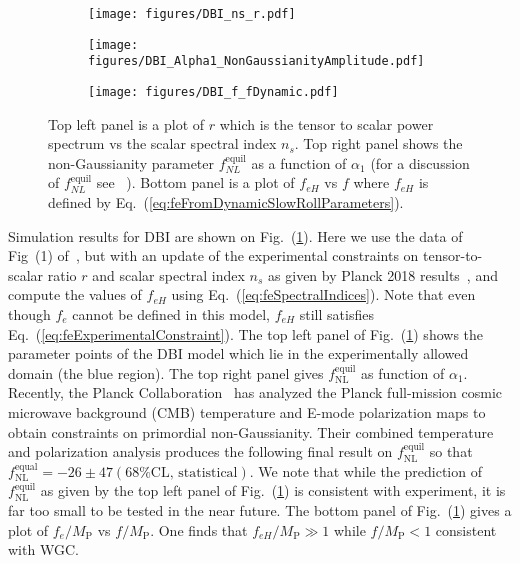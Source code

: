 \documentclass[11pt]{article}
\begin{document}
\begin{figure}
  \centering
  \begin{subfigure}{0.45 \textwidth}
    \texttt{[image: figures/DBI\_ns\_r.pdf]}
  \end{subfigure}
  \begin{subfigure}{0.45 \textwidth}
    \texttt{[image: figures/DBI\_Alpha1\_NonGaussianityAmplitude.pdf]}
  \end{subfigure}
  \begin{subfigure}{0.45 \textwidth}
    \texttt{[image: figures/DBI\_f\_fDynamic.pdf]}
  \end{subfigure}
  \caption{\protect
    Top left panel is a plot of $r$ which is the tensor to scalar power spectrum vs the scalar spectral index $n_s$.
    Top right panel shows the non-Gaussianity parameter $f_{NL}^\text{equil}$ as a function of $\alpha_1$ (for a discussion of $f_{NL}^\text{equil}$ see ~\cite{Nath:2018xxe}).
    Bottom panel is a plot of $f_{eH}$ vs $f$ where $f_{eH}$ is defined by Eq.~(\ref{eq:feFromDynamicSlowRollParameters}).} \label{fig:DBI}
\end{figure}

Simulation results for DBI are shown on Fig.~(\ref{fig:DBI}).
Here we use the data of Fig~(1) of~\cite{Nath:2018xxe}, but with an update of the experimental constraints on tensor-to-scalar ratio $r$ and scalar spectral index $n_s$ as given by Planck 2018 results~\cite{Akrami:2018odb}, and compute the values of $f_{eH}$ using Eq.~(\ref{eq:feSpectralIndices}).
Note that even though $f_e$ cannot be defined in this model, $f_{eH}$ still satisfies Eq.~(\ref{eq:feExperimentalConstraint}).
The top left panel of Fig.~(\ref{fig:DBI}) shows the parameter points of the DBI model which lie in the experimentally allowed domain (the blue region).
The top right panel gives $f^{\text{equil}}_{\text{NL}}$ as function of $\alpha_1$.
Recently, the Planck Collaboration~\cite{Akrami:2019izv} has analyzed the Planck full-mission cosmic microwave background (CMB) temperature and E-mode polarization maps to obtain constraints on primordial non-Gaussianity.
Their combined temperature and polarization analysis produces the following final result on $f^{\text{equil}}_{\text{NL}}$ so that $f^{\text{equal}}_{\text{NL}} = -26 \pm 47 \left(68 \% \text{CL, statistical}\right)$.
We note that while the prediction of $f^{\text{equil}}_{\text{NL}}$ as given by the top left panel of Fig.~(\ref{fig:DBI}) is consistent with experiment, it is far too small to be tested in the near future.
The bottom panel of Fig.~(\ref{fig:DBI}) gives a plot of $f_e / M_\text{P}$ vs $f / M_\text{P}$.
One finds that $f_{eH} / M_\text{P} \gg 1$ while $f / M_\text{P} < 1$ consistent with WGC.
\end{document}
